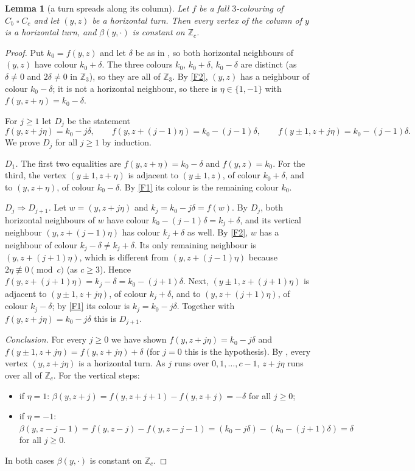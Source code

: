 \documentclass[11pt]{article}
\theoremstyle{plain}
\newtheorem{lemma}[lemma]{Lemma}
\theoremstyle{definition}
\theoremstyle{remark}
\newcommand{\Z}{\mathbb{Z}}
\newcommand{\T}{\mathbin{\square}}
\begin{document}
\begin{lemma}[a turn spreads along its column]\label{lem:turn-column}
Let $f$ be a fall $3$-colouring of $C_b \T C_c$ and let $(y, z)$ be a horizontal turn. Then
every vertex of the column of $y$ is a horizontal turn, and $\beta(y, \cdot)$ is constant on
$\Z_c$.
\end{lemma}

\begin{proof}
Put $k_0 = f(y,z)$ and let $\delta$ be as in , so both horizontal
neighbours of $(y,z)$ have colour $k_0 + \delta$. The three colours $k_0$, $k_0 + \delta$,
$k_0 - \delta$ are distinct (as $\delta \ne 0$ and $2\delta \ne 0$ in $\Z_3$), so they are all
of $\Z_3$. By \ref{F2}, $(y,z)$ has a neighbour of colour $k_0 - \delta$; it is not a
horizontal neighbour, so there is $\eta \in \{1, -1\}$ with $f(y, z + \eta) = k_0 - \delta$.

For $j \ge 1$ let $D_j$ be the statement
\[
f(y, z + j\eta) = k_0 - j\delta, \qquad f(y, z + (j-1)\eta) = k_0 - (j-1)\delta, \qquad
f(y \pm 1, z + j\eta) = k_0 - (j-1)\delta .
\]
We prove $D_j$ for all $j \ge 1$ by induction.

\emph{$D_1$.} The first two equalities are $f(y, z+\eta) = k_0 - \delta$ and $f(y,z) = k_0$.
For the third, the vertex $(y \pm 1, z + \eta)$ is adjacent to $(y \pm 1, z)$, of colour
$k_0 + \delta$, and to $(y, z + \eta)$, of colour $k_0 - \delta$. By \ref{F1} its colour is
the remaining colour $k_0$.

\emph{$D_j \Rightarrow D_{j+1}$.} Let $w = (y, z + j\eta)$ and $k_j = k_0 - j\delta = f(w)$.
By $D_j$, both horizontal neighbours of $w$ have colour $k_0 - (j-1)\delta = k_j + \delta$,
and its vertical neighbour $(y, z + (j-1)\eta)$ has colour $k_j + \delta$ as well. By
\ref{F2}, $w$ has a neighbour of colour $k_j - \delta \ne k_j + \delta$. Its only remaining
neighbour is $(y, z + (j+1)\eta)$, which is different from $(y, z + (j-1)\eta)$ because
$2\eta \not\equiv 0 \pmod c$ (as $c \ge 3$). Hence
$f(y, z + (j+1)\eta) = k_j - \delta = k_0 - (j+1)\delta$. Next, $(y \pm 1, z + (j+1)\eta)$ is
adjacent to $(y \pm 1, z + j\eta)$, of colour $k_j + \delta$, and to
$(y, z + (j+1)\eta)$, of colour $k_j - \delta$; by \ref{F1} its colour is $k_j =
k_0 - j\delta$. Together with $f(y, z + j\eta) = k_0 - j\delta$ this is $D_{j+1}$.

\emph{Conclusion.} For every $j \ge 0$ we have shown $f(y, z + j\eta) = k_0 - j\delta$ and
$f(y \pm 1, z + j\eta) = f(y, z + j\eta) + \delta$ (for $j = 0$ this is the hypothesis). By
, every vertex $(y, z + j\eta)$ is a horizontal turn. As $j$ runs over
$0, 1, \dots, c-1$, $z + j\eta$ runs over all of $\Z_c$. For the vertical steps:
\begin{itemize}
  \item if $\eta = 1$: $\beta(y, z + j) = f(y, z+j+1) - f(y, z+j) = -\delta$ for all $j \ge 0$;
  \item if $\eta = -1$: $\beta(y, z - j - 1) = f(y, z - j) - f(y, z - j - 1)
        = (k_0 - j\delta) - (k_0 - (j+1)\delta) = \delta$ for all $j \ge 0$.
\end{itemize}
In both cases $\beta(y, \cdot)$ is constant on $\Z_c$.
\end{proof}
\end{document}
